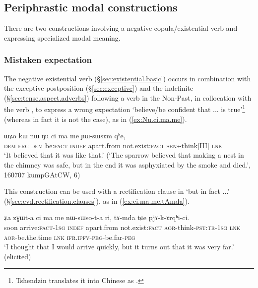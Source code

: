 \subsection{Periphrastic modal constructions} \label{sec:cimame.cinAmaRkW}
There are two constructions involving a negative copula/existential verb and expressing specialized modal meaning.

\subsubsection{Mistaken expectation} \label{sec:cimame}
The negative existential verb   (§\ref{sec:existential.basic}) occurs in combination with the exceptive postposition  (§\ref{sec:exceptive}) and the indefinite  (§\ref{sec:tense.aspect.adverbs}) following a verb in the Non-Past, in collocation with the verb , to express a wrong expectation `believe/be confident that ... is true'\footnote{Tshendzin translates it into Chinese as . } (whereas in fact it is not the case), as in (\ref{ex:Nu.ci.ma.me}). 


\begin{exe}
	\ex \label{ex:Nu.ci.ma.me}
	\gll ɯʑo kɯ nɯ ŋu ci ma me ɲɯ-sɯsɤm qʰe,  \\
	\textsc{dem} \textsc{erg} \textsc{dem} be:\textsc{fact} \textsc{indef} apart.from  not.exist:\textsc{fact} \textsc{sens}-think[III] \textsc{lnk} \\
	\glt `It believed that it was like that.'  (`The sparrow believed that making a nest in the chimney was safe, but in the end it was asphyxiated by the smoke and died.', 160707 kumpGAtCW, 6)
\end{exe}

This construction can be used with a rectification clause in   `but in fact ...' (§\ref{sec:evd.rectification.clauses}), as in (\ref{ex:ci.ma.me.tAmda}).

\begin{exe}
	\ex \label{ex:ci.ma.me.tAmda}
	\gll ʑa zɣɯt-a ci ma me nɯ-sɯso-t-a ri, tɤ-mda tɕe pjɤ-k-ɤrqʰi-ci. \\
	soon arrive:\textsc{fact}-\textsc{1sg} \textsc{indef} apart.from not.exist:\textsc{fact} \textsc{aor}-think-\textsc{pst}:\textsc{tr}-\textsc{1sg} \textsc{lnk} 
	\textsc{aor}-be.the.time \textsc{lnk}  \textsc{ifr}.\textsc{ipfv}-\textsc{peg}-be.far-\textsc{peg} \\
	\glt `I thought that I would arrive quickly, but it turns out that it was very far.' (elicited)
\end{exe}

